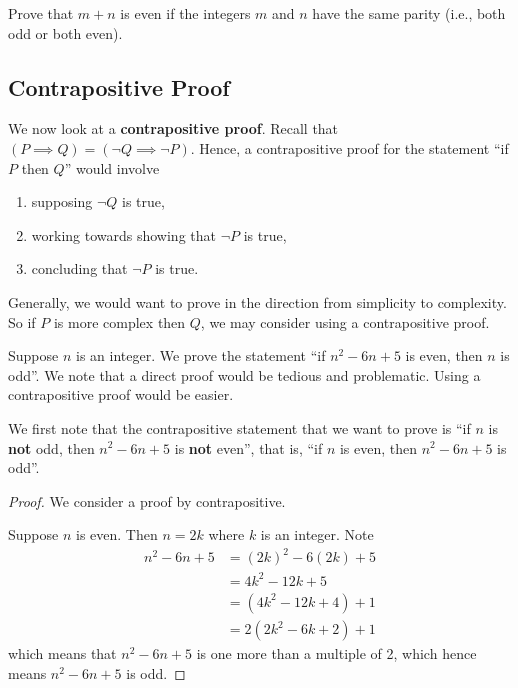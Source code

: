 \begin{exercise}
    Prove that $m + n$ is even if the integers $m$ and $n$ have the same parity (i.e., both odd or both even). 
\end{exercise}

\subsection{Contrapositive Proof}
We now look at a \textbf{contrapositive proof}. Recall that $(P \implies Q) = (\lnot Q \implies \lnot P)$. Hence, a contrapositive proof for the statement ``if $P$ then $Q$'' would involve
\begin{enumerate}
    \item supposing $\lnot Q$ is true,
    \item working towards showing that $\lnot P$ is true,
    \item concluding that $\lnot P$ is true.
\end{enumerate}

Generally, we would want to prove in the direction from simplicity to complexity. So if $P$ is more complex then $Q$, we may consider using a contrapositive proof.

\begin{example}\label{example-if-(n-1)(n-5)-is-even-then-n-is-odd}
    Suppose $n$ is an integer. We prove the statement ``if $n^2 - 6n + 5$ is even, then $n$ is odd''. We note that a direct proof would be tedious and problematic. Using a contrapositive proof would be easier.
    
    We first note that the contrapositive statement that we want to prove is ``if $n$ is \textbf{not} odd, then $n^2 - 6n + 5$ is \textbf{not} even'', that is, ``if $n$ is even, then $n^2 - 6n + 5$ is odd''.
    \begin{proof}
        We consider a proof by contrapositive.
        
        Suppose $n$ is even. Then $n = 2k$ where $k$ is an integer. Note
        \begin{align*}
            n^2 - 6n + 5 &= (2k)^2 - 6(2k) + 5\\
            &= 4k^2 - 12k + 5\\
            &= (4k^2 - 12k + 4) + 1\\
            &= 2(2k^2 - 6k + 2) + 1
        \end{align*}
        which means that $n^2 - 6n + 5$ is one more than a multiple of 2, which hence means $n^2 - 6n + 5$ is odd.
    \end{proof}    
\end{example}

